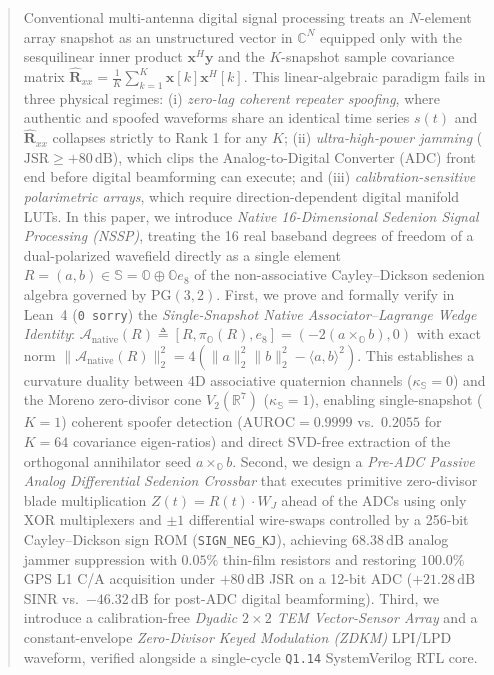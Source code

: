 \documentclass[journal,twoside]{IEEEtran}
\theoremstyle{definition}
\theoremstyle{remark}
\newcommand{\R}{\mathbb{R}}
\newcommand{\C}{\mathbb{C}}
\newcommand{\Oc}{\mathbb{O}}
\newcommand{\Se}{\mathbb{S}}
\newcommand{\PG}{\mathrm{PG}}
\newcommand{\Anative}{\mathcal{A}_{\mathrm{native}}}
\newcommand{\kappas}{\kappa_{\Se}}
\begin{document}
\begin{abstract}
Conventional multi-antenna digital signal processing treats an $N$-element array snapshot as an unstructured vector in $\C^N$ equipped only with the sesquilinear inner product $\bm{x}^H\bm{y}$ and the $K$-snapshot sample covariance matrix $\hat{\bm{R}}_{xx} = \frac{1}{K}\sum_{k=1}^K \bm{x}[k]\bm{x}^H[k]$. This linear-algebraic paradigm fails in three physical regimes: (i) \emph{zero-lag coherent repeater spoofing}, where authentic and spoofed waveforms share an identical time series $s(t)$ and $\hat{\bm{R}}_{xx}$ collapses strictly to Rank 1 for any $K$; (ii) \emph{ultra-high-power jamming} ($\mathrm{JSR} \ge +80\,\mathrm{dB}$), which clips the Analog-to-Digital Converter (ADC) front end before digital beamforming can execute; and (iii) \emph{calibration-sensitive polarimetric arrays}, which require direction-dependent digital manifold LUTs. In this paper, we introduce \emph{Native 16-Dimensional Sedenion Signal Processing (NSSP)}, treating the 16 real baseband degrees of freedom of a dual-polarized wavefield directly as a single element $R = (a,b) \in \Se = \Oc \oplus \Oc e_8$ of the non-associative Cayley--Dickson sedenion algebra governed by $\PG(3,2)$. First, we prove and formally verify in Lean~4 (\texttt{0 sorry}) the \emph{Single-Snapshot Native Associator--Lagrange Wedge Identity}: $\Anative(R) \triangleq [R, \pi_{\Oc}(R), e_8] = (-2(a\times_{\Oc} b), 0)$ with exact norm $\|\Anative(R)\|_2^2 = 4(\|a\|_2^2\|b\|_2^2 - \langle a,b\rangle^2)$. This establishes a curvature duality between 4D associative quaternion channels ($\kappas=0$) and the Moreno zero-divisor cone $V_2(\R^7)$ ($\kappas=1$), enabling single-snapshot ($K=1$) coherent spoofer detection ($\mathrm{AUROC}=0.9999$ vs.\ $0.2055$ for $K=64$ covariance eigen-ratios) and direct SVD-free extraction of the orthogonal annihilator seed $a\times_{\Oc} b$. Second, we design a \emph{Pre-ADC Passive Analog Differential Sedenion Crossbar} that executes primitive zero-divisor blade multiplication $Z(t) = R(t)\cdot W_J$ ahead of the ADCs using only XOR multiplexers and $\pm 1$ differential wire-swaps controlled by a 256-bit Cayley--Dickson sign ROM (\texttt{SIGN\_NEG\_KJ}), achieving $68.38\,\mathrm{dB}$ analog jammer suppression with $0.05\%$ thin-film resistors and restoring $100.0\%$ GPS L1 C/A acquisition under $+80\,\mathrm{dB}$ JSR on a 12-bit ADC ($+21.28\,\mathrm{dB}$ SINR vs.\ $-46.32\,\mathrm{dB}$ for post-ADC digital beamforming). Third, we introduce a calibration-free \emph{Dyadic $2\times 2$ TEM Vector-Sensor Array} and a constant-envelope \emph{Zero-Divisor Keyed Modulation (ZDKM)} LPI/LPD waveform, verified alongside a single-cycle \texttt{Q1.14} SystemVerilog RTL core.
\end{abstract}
\end{document}
